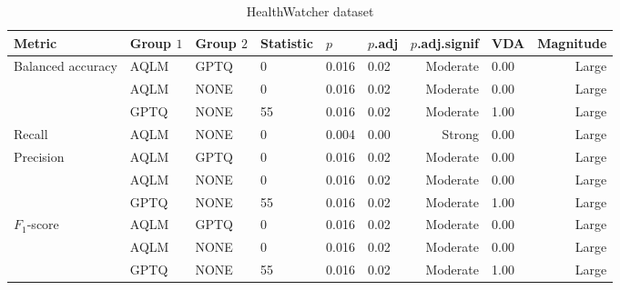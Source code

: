 \begin{table}[h]
\centering
\caption*{HealthWatcher dataset}
\begin{tabular}{llllllrlr}
\toprule
Metric & Group $1$ & Group $2$ & Statistic & $p$ & $p$.adj & $p$.adj.signif & VDA & Magnitude\\
\midrule
Balanced accuracy & AQLM & GPTQ & 0 & 0.016 & 0.02 & Moderate & 0.00 & Large \\
\phantom & AQLM & NONE & 0 & 0.016 & 0.02 & Moderate & 0.00 & Large \\
\phantom & GPTQ & NONE & 55 & 0.016 & 0.02 & Moderate & 1.00 & Large \\
\midrule
Recall & AQLM & NONE & 0 & 0.004 & 0.00 & Strong & 0.00 & Large \\
\midrule
Precision & AQLM & GPTQ & 0 & 0.016 & 0.02 & Moderate & 0.00 & Large \\
\phantom & AQLM & NONE & 0 & 0.016 & 0.02 & Moderate & 0.00 & Large \\
\phantom & GPTQ & NONE & 55 & 0.016 & 0.02 & Moderate & 1.00 & Large \\
\midrule
$F_1$-score & AQLM & GPTQ & 0 & 0.016 & 0.02 & Moderate & 0.00 & Large \\
\phantom & AQLM & NONE & 0 & 0.016 & 0.02 & Moderate & 0.00 & Large \\
\phantom & GPTQ & NONE & 55 & 0.016 & 0.02 & Moderate & 1.00 & Large \\\end{tabular}
\label{tab:RQ1_posthoc_full}
\end{table}
